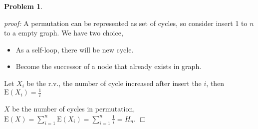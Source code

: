 \documentclass{article}
\newtheorem{problem}[theorem]{Problem}
\newenvironment{solution}{\noindent \textit{proof:}}{$\Box$}
\begin{document}
\begin{problem}
\end{problem}
\begin{solution}
    A permutation can be represented as set of cycles, so consider insert 1 to $n$ to a empty graph. We have two choice,
    \begin{itemize}
        \item As a self-loop, there will be new cycle.
        \item Become the successor of a node that already exists in graph.
    \end{itemize}
    
    Let $X_i$ be the r.v., the number of cycle increased after insert the $i$, then $\mathrm{E}(X_i) = \frac 1 i$
    
    $X$ be the number of cycles in permutation, 
    $\mathrm{E}(X) = \sum_{i=1}^n\mathrm{E}(X_i) = \sum_{i=1}^n \frac 1 i = H_n$.
\end{solution}
\end{document}

